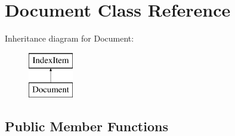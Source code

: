 \hypertarget{class_document}{}\section{Document Class Reference}
\label{class_document}
Inheritance diagram for Document\+:\begin{figure}[H]
\begin{center}
\leavevmode
\includegraphics[height=2.000000cm]{class_document}
\end{center}
\end{figure}
\subsection*{Public Member Functions}
